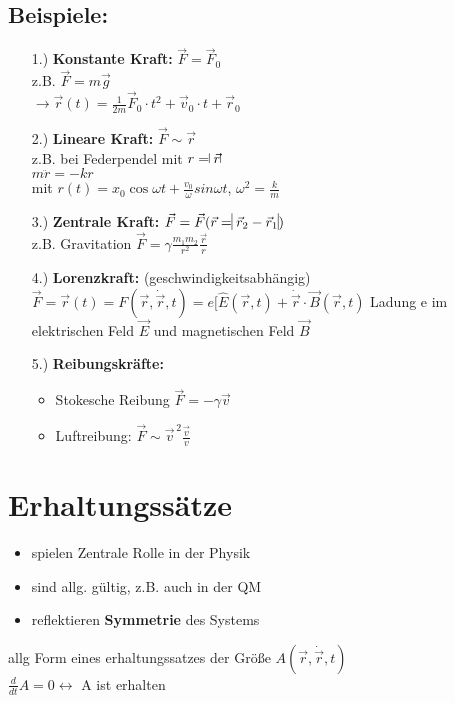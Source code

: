 \documentclass[titlepage,12pt,a4paper,ngerman]{report}
\begin{document}
\subsection{Beispiele:}
\begin{itemize}
	\item[1.)] \textbf{Konstante Kraft:} $\vec{F} =\vec{F}_{0}$\\
	z.B. $\vec{F}=m\vec{g}$\\
	$\rightarrow \vec{r}(t) = \frac{1}{2m} \vec{F}_{0} \cdot t^2 + \vec{v}_{0} \cdot t+\vec{r}_{0}$
	\item[2.)] \textbf{Lineare Kraft:} $\vec{F} \sim \vec{r}$\\
	z.B. bei Federpendel mit $r= \vline \vec{r}\vline $\\
	$m\ddot{r} = - k r$\\
	mit $r(t) = x_{0} \cos{\omega t} + \frac{v_{0}}{\omega} sin{\omega t}$, $\omega^2 = \frac{k}{m}$\\
	\item[3.)] \textbf{Zentrale Kraft:} $\vec{F} = \vec{F}(\vec{r}=\vline \vec{r}_{2}-\vec{r}_{1}\vline )$\\
	z.B. Gravitation $\vec{F} = \gamma \frac{m_1 m_2 }{r^2} \frac{\vec{r}}{ r}$
	\item[4.)] \textbf{Lorenzkraft:} (geschwindigkeitsabhängig)\\
	$\vec{F}={\vec{r}}(t) = F(\vec{r},\dot{\vec{r}}, t) = e[\hat{E} (\vec{r}, t) + \dot{\vec{r}} \cdot \vec{B} (\vec{r},t)$
	Ladung e im elektrischen Feld $\vec{E}$ und magnetischen Feld $\vec{B}$
	\item[5.)] \textbf{Reibungskräfte:}
	\begin{itemize}
		\item Stokesche Reibung $\vec{F} = -\gamma \vec{v}$
		\item Luftreibung: $\vec{F} \sim \vec{v}^{\,2} \frac{\vec{v}}{v}$
	\end{itemize}
\end{itemize}

\section{Erhaltungssätze}
\begin{itemize}
	\item spielen Zentrale Rolle in der Physik
	\item sind allg. gültig, z.B. auch in der QM
	\item reflektieren \textbf{Symmetrie} des Systems
\end{itemize}
allg Form eines erhaltungssatzes der Größe $A(\vec{r},\dot{\vec{r}},t)$\\
$\frac{d}{dt} A = 0 \leftrightarrow $ A ist erhalten\par
\end{document}
